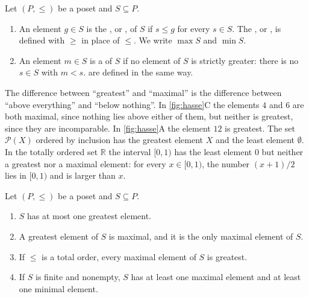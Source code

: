 \begin{definition}
\label{def:maximal}
Let $(P,\le)$ be a poset and $S\subseteq P$.
\begin{enumerate}
\item An element $g\in S$ is the , or , of $S$ if $s\le g$ for every $s\in S$. The , or , is defined with $\ge$ in place of $\le$. We write $\max S$ and $\min S$.
\item An element $m\in S$ is a  of $S$ if no element of $S$ is strictly greater: there is no $s\in S$ with $m<s$.  are defined in the same way.
\end{enumerate}
\end{definition}

The difference between ``greatest'' and ``maximal'' is the difference between ``above everything'' and ``below nothing''. In \cref{fig:hasse}C the elements $4$ and $6$ are both maximal, since nothing lies above either of them, but neither is greatest, since they are incomparable. In \cref{fig:hasse}A the element $12$ is greatest. The set $\mathcal P(X)$ ordered by inclusion has the greatest element $X$ and the least element $\emptyset$. In the totally ordered set $\mathbb R$ the interval $[0,1)$ has the least element $0$ but neither a greatest nor a maximal element: for every $x\in[0,1)$, the number $(x+1)/2$ lies in $[0,1)$ and is larger than $x$.

\begin{proposition}
\label{prop:maximal}
Let $(P,\le)$ be a poset and $S\subseteq P$.
\begin{enumerate}
\item $S$ has at most one greatest element.
\item A greatest element of $S$ is maximal, and it is the only maximal element of $S$.
\item If $\le$ is a total order, every maximal element of $S$ is greatest.
\item If $S$ is finite and nonempty, $S$ has at least one maximal element and at least one minimal element.
\end{enumerate}
\end{proposition}

